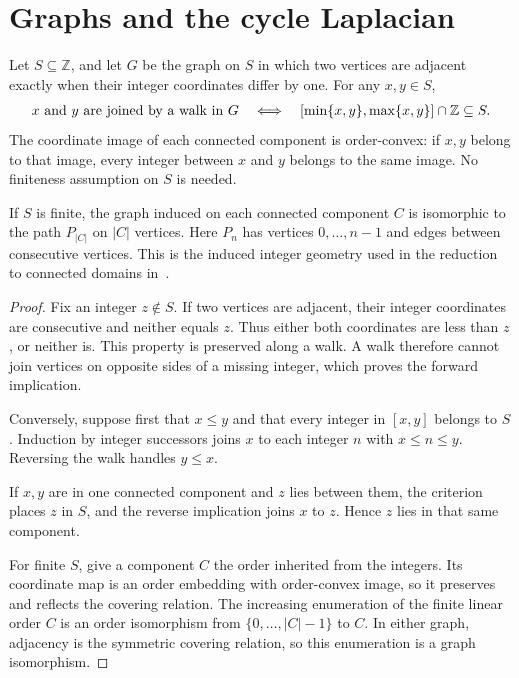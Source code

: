 \section{Graphs and the cycle Laplacian}

\begin{lemma}
    \label{thm:chain_integer_domain_components}
    \leanok
    Let $S\subseteq\mathbb Z$, and let $G$ be the graph on $S$ in which two
    vertices are adjacent exactly when their integer coordinates differ by one.
    For any $x,y\in S$,
    \begin{align}
        x\text{ and }y\text{ are joined by a walk in }G
        \quad\Longleftrightarrow\quad
        \lbrack\min\{x,y\},\max\{x,y\}\rbrack\cap\mathbb Z\subseteq S.
        \notag
    \end{align}
    The coordinate image of each connected component is order-convex:
    if $x,y$ belong to that image, every integer between $x$ and $y$ belongs to
    the same image. No finiteness assumption on $S$ is needed.

    If $S$ is finite, the graph induced on each connected component $C$ is
    isomorphic to the path $P_{|C|}$ on $|C|$ vertices. Here $P_n$ has vertices
    $0,\ldots,n-1$ and edges between consecutive vertices. This is the induced
    integer geometry used in the reduction to connected domains
    in~\cite[Part~I]{TNLean2026OneDimensional}.
\end{lemma}

\begin{proof}\leanok
    Fix an integer $z\notin S$. If two vertices are adjacent, their integer
    coordinates are consecutive and neither equals $z$. Thus either both
    coordinates are less than $z$, or neither is. This property is preserved
    along a walk. A walk therefore cannot join vertices on opposite sides of
    a missing integer, which proves the forward implication.

    Conversely, suppose first that $x\le y$ and that every integer in $[x,y]$
    belongs to $S$. Induction by integer successors joins $x$ to each integer
    $n$ with $x\le n\le y$. Reversing the walk handles $y\le x$.

    If $x,y$ are in one connected component and $z$ lies between them, the
    criterion places $z$ in $S$, and the reverse implication joins $x$ to $z$.
    Hence $z$ lies in that same component.

    For finite $S$, give a component $C$ the order inherited from the integers.
    Its coordinate map is an order embedding with order-convex image, so it
    preserves and reflects the covering relation. The increasing enumeration
    of the finite linear order $C$ is an order isomorphism from
    $\{0,\ldots,|C|-1\}$ to $C$. In either graph, adjacency is the symmetric
    covering relation, so this enumeration is a graph isomorphism.
\end{proof}

